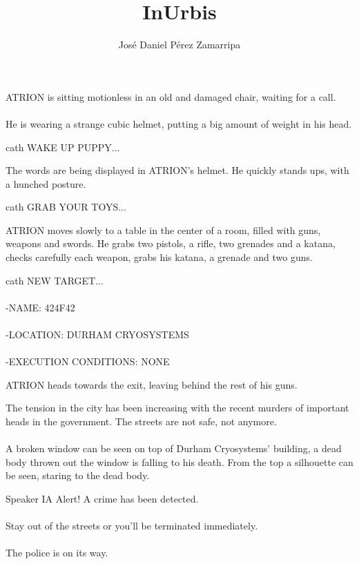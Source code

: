 \documentclass{screenplay}
\title{InUrbis}
\author{José Daniel Pérez Zamarripa}
\begin{document}
\coverpage
{}
ATRION is sitting motionless in an old and damaged chair, waiting for a call.
\\~\\
He is wearing a strange cubic helmet, putting a big amount of weight in his head. 

\begin{dialogue}{cath}
WAKE UP PUPPY...
\end{dialogue}
The words are being displayed in ATRION's helmet. He quickly stands ups, with a hunched posture.

\begin{dialogue}{cath}
GRAB YOUR TOYS... 
\end{dialogue}

ATRION moves slowly to a table in the center of a room, filled with guns, weapons and swords. He grabs two pistols, a rifle, two grenades and a katana, checks carefully each weapon, grabs his katana, a grenade and two guns.

\begin{dialogue}{cath}
NEW TARGET...
\\~\\
-NAME: 424F42
\\~\\
-LOCATION: DURHAM CRYOSYSTEMS
\\~\\
-EXECUTION CONDITIONS: NONE
\end{dialogue}

ATRION heads towards the exit, leaving behind the rest of his guns.

The tension in the city has been increasing with the recent murders of important heads in the government. The streets are not safe, not anymore.
\\~\\
A broken window can be seen on top of Durham Cryosystems' building, a dead body thrown out the window is falling to his death. From the top a silhouette can be seen, staring to the dead body.

\begin{dialogue}{Speaker IA}
Alert! A crime has been detected. \\~\\Stay out of the streets or you'll be terminated immediately.\\~\\
The police is on its way.
\end{dialogue}
\end{document}
